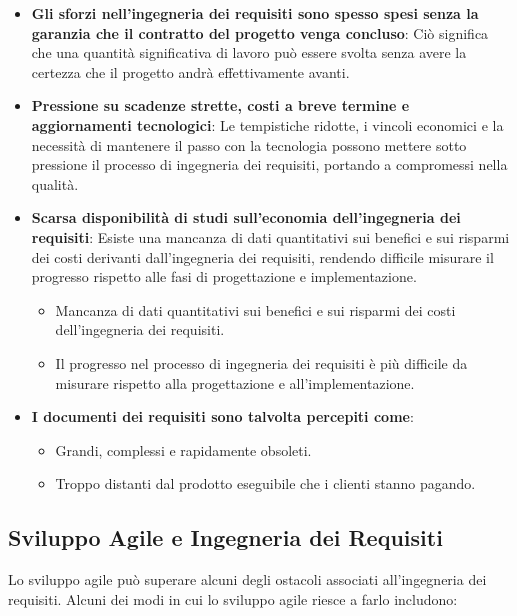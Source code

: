 \begin{itemize}
    \item \textbf{Gli sforzi nell'ingegneria dei requisiti sono spesso spesi
    senza la garanzia che il contratto del progetto venga concluso}: Ciò significa
    che una quantità significativa di lavoro può essere svolta senza avere la
    certezza che il progetto andrà effettivamente avanti.
    
    \item \textbf{Pressione su scadenze strette, costi a breve termine e
    aggiornamenti tecnologici}: Le tempistiche ridotte, i vincoli economici
    e la necessità di mantenere il passo con la tecnologia possono mettere
    sotto pressione il processo di ingegneria dei requisiti, portando a compromessi
    nella qualità.
    
    \item \textbf{Scarsa disponibilità di studi sull'economia dell'ingegneria
    dei requisiti}: Esiste una mancanza di dati quantitativi sui benefici e
    sui risparmi dei costi derivanti dall'ingegneria dei requisiti, rendendo
    difficile misurare il progresso rispetto alle fasi di progettazione e
    implementazione.
    
    \begin{itemize}
        \item Mancanza di dati quantitativi sui benefici e sui risparmi dei
        costi dell'ingegneria dei requisiti.
        \item Il progresso nel processo di ingegneria dei requisiti è più
        difficile da misurare rispetto alla progettazione e all'implementazione.
    \end{itemize}
    
    \item \textbf{I documenti dei requisiti sono talvolta percepiti come}: 
    \begin{itemize}
        \item Grandi, complessi e rapidamente obsoleti.
        \item Troppo distanti dal prodotto eseguibile che i clienti stanno pagando.
    \end{itemize}
\end{itemize}
\subsection{Sviluppo Agile e Ingegneria dei Requisiti}

Lo sviluppo agile può superare alcuni degli ostacoli associati all'ingegneria
dei requisiti. Alcuni dei modi in cui lo sviluppo agile riesce a farlo includono:

